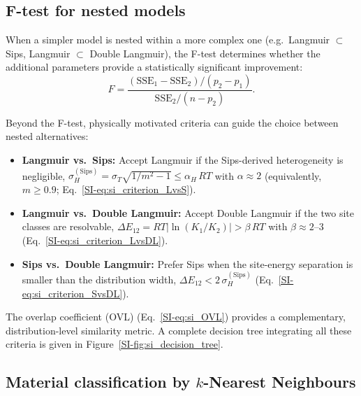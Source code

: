 \documentclass[journal=jacsat,manuscript=article]{achemso}
\begin{document}
	\subsection{F-test for nested models}
	\label{sec:Ftest}

	When a simpler model is nested within a more complex one (e.g.\ Langmuir $\subset$ Sips, Langmuir $\subset$ Double Langmuir), the F-test determines whether the additional parameters provide a statistically significant improvement:
	\begin{equation}
		F = \frac{(\mathrm{SSE}_1 - \mathrm{SSE}_2)/(p_2 - p_1)}
		{\mathrm{SSE}_2 / (n - p_2)}.
		\label{eq:Ftest}
	\end{equation}

	Beyond the F-test, physically motivated criteria can guide the choice between nested alternatives:
	\begin{itemize}
		\item \textbf{Langmuir vs.\ Sips:} Accept Langmuir if the Sips-derived heterogeneity is negligible, $\sigma_H^{\mathrm{(Sips)}} = \sigma_T\sqrt{1/m^2-1} \leq \alpha_H\,RT$ with $\alpha \approx 2$ (equivalently, $m \geq 0.9$; Eq.~\ref{SI-eq:si_criterion_LvsS}).
		\item \textbf{Langmuir vs.\ Double Langmuir:} Accept Double Langmuir if the two site classes are resolvable, $\Delta E_{12} = RT|\ln(K_1/K_2)| > \beta\,RT$ with $\beta \approx 2$--$3$ (Eq.~\ref{SI-eq:si_criterion_LvsDL}).
		\item \textbf{Sips vs.\ Double Langmuir:} Prefer Sips when the site-energy separation is smaller than the distribution width, $\Delta E_{12} < 2\,\sigma_H^{\mathrm{(Sips)}}$ (Eq.~\ref{SI-eq:si_criterion_SvsDL}).
	\end{itemize}
	The overlap coefficient (OVL) (Eq.~\ref{SI-eq:si_OVL}) provides a complementary, distribution-level similarity metric. A complete decision tree integrating all these criteria is given in Figure~\ref{SI-fig:si_decision_tree}.

	\subsection{Material classification by $k$-Nearest Neighbours}
	\label{sec:KNN}
\end{document}
